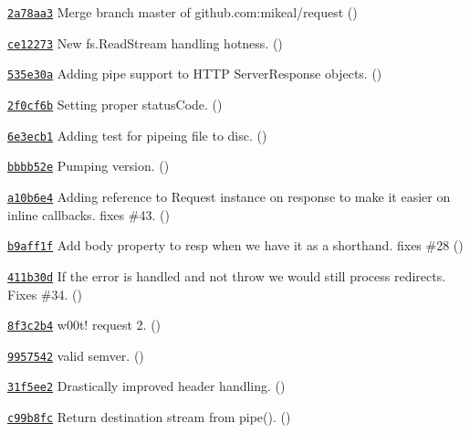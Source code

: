 \begin{DoxyItemize}
\item \href{https://github.com/mikeal/request/commit/2a78aa3f827e76c548e001fa519448b24466b518}{\tt 2a78aa3} Merge branch \textquotesingle{}master\textquotesingle{} of github.\+com\+:mikeal/request ()
\item \href{https://github.com/mikeal/request/commit/ce12273d3990c1446d3166bbd9e35c0e2435f137}{\tt ce12273} New fs.\+Read\+Stream handling hotness. ()
\item \href{https://github.com/mikeal/request/commit/535e30a4bd4a8e41d97ffa6a4e99630ac09a4bcb}{\tt 535e30a} Adding pipe support to H\+T\+T\+P Server\+Response objects. ()
\item \href{https://github.com/mikeal/request/commit/2f0cf6bf44edbaec4c0a0cb15a679302de7f0aff}{\tt 2f0cf6b} Setting proper status\+Code. ()
\item \href{https://github.com/mikeal/request/commit/6e3ecb106c3a32101d80ac0f87968fddd3ac5e2c}{\tt 6e3ecb1} Adding test for pipeing file to disc. ()
\item \href{https://github.com/mikeal/request/commit/bbbb52e406b65100b557caa3687a1aa04fab6ff3}{\tt bbbb52e} Pumping version. ()
\item \href{https://github.com/mikeal/request/commit/a10b6e4c08478364b8079801fdb23f3530fcc85f}{\tt a10b6e4} Adding reference to Request instance on response to make it easier on inline callbacks. fixes \#43. ()
\item \href{https://github.com/mikeal/request/commit/b9aff1fe007dab3f93e666f047fa03a4e8f5f8b7}{\tt b9aff1f} Add body property to resp when we have it as a shorthand. fixes \#28 ()
\item \href{https://github.com/mikeal/request/commit/411b30dab1fe5b20880113aa801a2fdbb7c35c40}{\tt 411b30d} If the error is handled and not throw we would still process redirects. Fixes \#34. ()
\item \href{https://github.com/mikeal/request/commit/8f3c2b4f6dee8838f30e2430a23d5071128148f0}{\tt 8f3c2b4} w00t! request 2. ()
\item \href{https://github.com/mikeal/request/commit/9957542cc6928443f3a7769510673665b5a90040}{\tt 9957542} valid semver. ()
\item \href{https://github.com/mikeal/request/commit/31f5ee28726ac7e14355cad0c6d2785f9ca422c6}{\tt 31f5ee2} Drastically improved header handling. ()
\item \href{https://github.com/mikeal/request/commit/c99b8fcd706ae035f6248669b017ac2995e45f31}{\tt c99b8fc} Return destination stream from pipe(). ()

\end{DoxyItemize}
